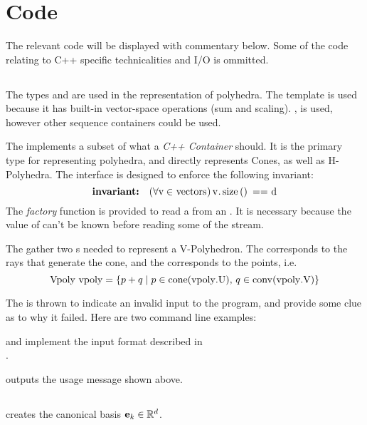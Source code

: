 \section{Code}

The relevant code will be displayed with commentary below.  Some of the code relating to C{++} specific technicalities and I/O is ommitted.

\subsection{}
The types  and  are used in the representation of polyhedra.  The  template is used because it has built-in vector-space operations (sum and scaling).  , is used, however other sequence containers could be used.
\lsttdVecs

The  implements a subset of what a \textit{C++ Container} should.  It is the primary type for representing polyhedra, and directly represents Cones, as well as H-Polyhedra.  The interface is designed to enforce the following invariant:
\[ \invariant{(\forall \mli{v} \in \mli{vectors})\, \mli{v.size() == d}} \]
  The \textit{factory} function  is provided to read a  from an .  It is necessary because the value of  can't be known before reading some of the stream.
\lstMatrix

The  gather two s needed to represent a V-Polyhedron.  The  corresponds to the rays that generate the cone, and the  corresponds to the points, i.e. 
  \[ \mli{Vpoly vpoly} = \set{p + q \st p \in \cone(\mli{vpoly.U}),\, q \in \conv( \mli{vpoly.V} )} \]
\lstVPoly

The  is thrown to indicate an invalid input to the program, and provide some clue as to why it failed.  Here are two command line examples:

\lstinputerror

 and  implement the input format described in \\.
\lstissV
\lstossV

 outputs the usage message shown above.
\lstusage

\subsection{}
 creates the canonical basis  $\mathbf{e}_k \in \mathbb{R}^d$.
\lstek

